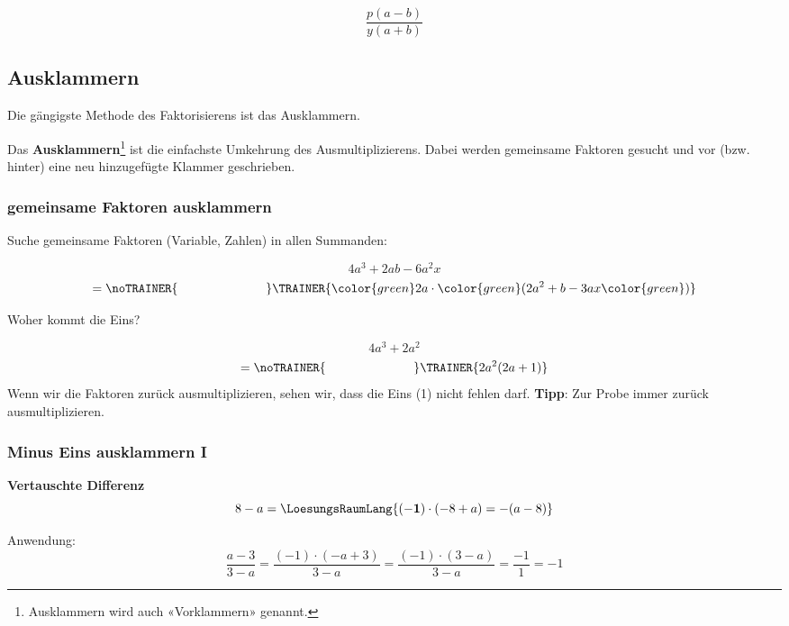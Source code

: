 $$\frac{p(a-b)}{y(a+b)}$$

\newpage

\subsection{Ausklammern}
Die gängigste Methode des Faktorisierens ist das Ausklammern.

Das \textbf{Ausklammern}\footnote{Ausklammern wird auch «Vorklammern» genannt.} ist die einfachste Umkehrung des Ausmultiplizierens.
Dabei werden gemeinsame Faktoren gesucht und vor (bzw. hinter) eine
neu hinzugefügte Klammer geschrieben.

\subsubsection{gemeinsame Faktoren ausklammern}
Suche gemeinsame Faktoren (Variable, Zahlen) in allen Summanden:

\begin{beispiel}{}{}
  $$4a^3 + 2ab -6a^2x$$
  $$=\noTRAINER{\hspace{7em}}\TRAINER{ {\color{green}2a}\cdot{\color{green}(}2a^2+b -3ax{\color{green})}}$$
\end{beispiel}

\begin{beispiel}{Woher kommt die Eins?}{}

$$4a^3 + 2a^2$$
$$=\noTRAINER{\hspace{7em}}\TRAINER{2a^2(2a + 1)}$$
Wenn wir die Faktoren zurück ausmultiplizieren, sehen wir, dass die
Eins (1) nicht fehlen darf. \textbf{Tipp}: Zur Probe immer zurück ausmultiplizieren.
\end{beispiel}

\newpage


\subsubsection{Minus Eins ausklammern I}

\textbf{Vertauschte Differenz}\\

$$8-a = \LoesungsRaumLang{\mathbf{(-1)\cdot{}} (-8 + a) = -(a-8)}$$

Anwendung:
$$\frac{a-3}{3-a} = \frac{(-1)\cdot{}(-a+3)}{3-a} = \frac{(-1)\cdot{}(3-a)}{3-a} = \frac{-1}1 = -1$$


